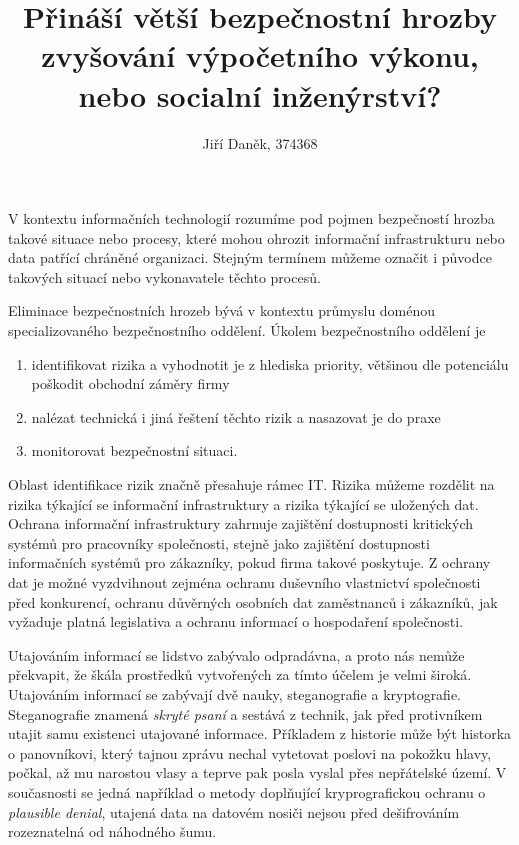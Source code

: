 \documentclass[12pt,draft]{article}
\title{Přináší větší bezpečnostní hrozby zvyšování výpočetního výkonu, nebo socialní inženýrství?}
\author{Jiří Daněk, 374368}
\begin{document}
\maketitle



V kontextu informačních technologií rozumíme pod pojmen bezpečností hrozba takové situace nebo procesy, které mohou ohrozit informační infrastrukturu nebo data patřící chráněné organizaci. Stejným termínem můžeme označit i původce takových situací nebo vykonavatele těchto procesů.

Eliminace bezpečnostních hrozeb bývá v kontextu průmyslu doménou specializovaného bezpečnostního oddělení. Úkolem bezpečnostního oddělení je

\begin{enumerate}
\item identifikovat rizika a vyhodnotit je z hlediska priority, většinou dle potenciálu poškodit obchodní záměry firmy
\item nalézat technická i jiná řeštení těchto rizik a nasazovat je do praxe
\item monitorovat bezpečnostní situaci.
\end{enumerate}

Oblast identifikace rizik značně přesahuje rámec IT. Rizika můžeme rozdělit na rizika týkající se informační infrastruktury a rizika týkající se uložených dat. Ochrana informační infrastruktury zahrnuje zajištění dostupnosti kritických systémů pro pracovníky společnosti, stejně jako zajištění dostupnosti informačních systémů pro zákazníky, pokud firma takové poskytuje. Z ochrany dat je možné vyzdvihnout zejména ochranu duševního vlastnictví společnosti před konkurencí, ochranu důvěrných osobních dat zaměstnanců i zákazníků, jak vyžaduje platná legislativa a ochranu informací o hospodaření společnosti.


Utajováním informací se lidstvo zabývalo odpradávna, a proto nás nemůže překvapit, že škála prostředků vytvořených za tímto účelem je velmi široká. Utajováním informací se zabývají dvě nauky, steganografie a kryptografie. Steganografie znamená \textit{skryté psaní} a sestává z technik, jak před protivníkem utajit samu existenci utajované informace. Příkladem z historie může být historka o panovníkovi, který tajnou zprávu nechal vytetovat poslovi na pokožku hlavy, počkal, až mu narostou vlasy a teprve pak posla vyslal přes nepřátelské území. V současnosti se jedná například o metody doplňující kryprografickou ochranu o \textit{plausible denial}, utajená data na datovém nosiči nejsou před dešifrováním rozeznatelná od náhodného šumu.
\end{document}
